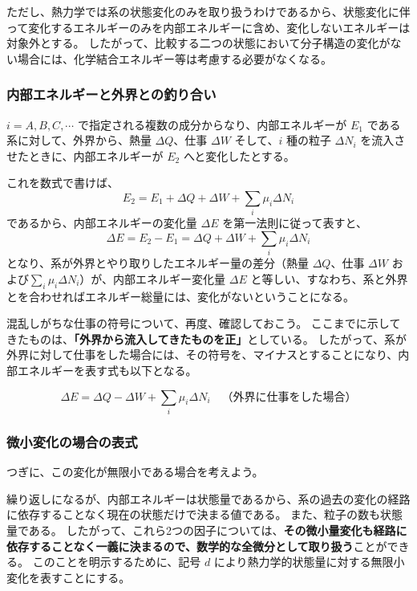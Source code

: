 \documentclass[uplatex,dvipdfmx,a4paper,11pt]{jsarticle}
\begin{document}
ただし、熱力学では系の状態変化のみを取り扱うわけであるから、状態変化に伴って変化するエネルギーのみを内部エネルギーに含め、変化しないエネルギーは対象外とする。
したがって、比較する二つの状態において分子構造の変化がない場合には、化学結合エネルギー等は考慮する必要がなくなる。


\subsubsection{内部エネルギーと外界との釣り合い}
$i = A, B, C, \cdots$ で指定される複数の成分からなり、内部エネルギーが $E_1$ である系に対して、外界から、熱量 $\Delta Q$、仕事 $\Delta W$ そして、$i$ 種の粒子 $\Delta N_i$ を流入させたときに、内部エネルギーが $E_2$ へと変化したとする。

これを数式で書けば、
\begin{equation}
E_2 = E_1 + \Delta Q + \Delta W + \sum_i \mu_i \Delta N_i
\end{equation}
であるから、内部エネルギーの変化量 $\Delta E$ を第一法則に従って表すと、
\begin{equation}
\Delta E = E_2 -E_1 = \Delta Q + \Delta W + \sum_i \mu_i \Delta N_i
\end{equation}
となり、系が外界とやり取りしたエネルギー量の差分（熱量 $\Delta Q$、仕事 $\Delta W$ および$\sum_i \mu_i \Delta N_i$）が、内部エネルギー変化量 $\Delta E$ と等しい、すなわち、系と外界とを合わせればエネルギー総量には、変化がないということになる。

混乱しがちな仕事の符号について、再度、確認しておこう。
ここまでに示してきたものは、{\bf 「外界から流入してきたものを正」}としている。
したがって、系が外界に対して仕事をした場合には、その符号を、マイナスとすることになり、内部エネルギーを表す式も以下となる。

\begin{equation*}
\Delta E = \Delta Q - \Delta W + \sum_i \mu_i \Delta N_i \quad \text{（外界に仕事をした場合）}
\end{equation*}

\subsubsection{微小変化の場合の表式}
つぎに、この変化が無限小である場合を考えよう。

繰り返しになるが、内部エネルギーは状態量であるから、系の過去の変化の経路に依存することなく現在の状態だけで決まる値である。
また、粒子の数も状態量である。
したがって、これら2つの因子については、{\bf その微小量変化も経路に依存することなく一義に決まるので、数学的な全微分として取り扱う}ことができる。
このことを明示するために、記号 $d$ により熱力学的状態量に対する無限小変化を表すことにする。
\end{document}
